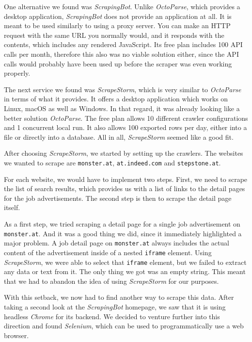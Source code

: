 \documentclass[runningheads]{llncs}
\begin{document}
One alternative we found was \textit{ScrapingBot}. Unlike \textit{OctoParse}, which provides a desktop application, \textit{ScrapingBot} does not provide an application at all. It is meant to be used similarly to using a proxy server. You can make an HTTP request with the same URL you normally would, and it responds with the contents, which includes any rendered JavaScript. Its free plan includes 100 API calls per month, therefore this also was no viable solution either, since the API calls would probably have been used up before the scraper was even working properly.

The next service we found was \textit{ScrapeStorm}, which is very similar to \textit{OctoParse} in terms of what it provides. It offers a desktop application which works on Linux, macOS as well as Windows. In that regard, it was already looking like a better solution \textit{OctoParse}. The free plan allows 10 different crawler configurations and 1 concurrent local run. It also allows 100 exported rows per day, either into a file or directly into a database. All in all, \textit{ScrapeStorm} seemed like a good fit.

After choosing \textit{ScrapeStorm}, we started by setting up the crawlers. The websites we wanted to scrape are \texttt{monster.at}, \texttt{at.indeed.com} and \texttt{stepstone.at}.

For each website, we would have to implement two steps. First, we need to scrape the list of search results, which provides us with a list of links to the detail pages for the job advertisements. The second step is then to scrape the detail page itself.

As a first step, we tried scraping a detail page for a single job advertisement on \texttt{monster.at}. And it was a good thing we did, since it immediately highlighted a major problem. A job detail page on \texttt{monster.at} always includes the actual content of the advertisement inside of a nested \texttt{iframe} element. Using \textit{ScrapeStorm}, we were able to select that \texttt{iframe} element, but we failed to extract any data or text from it. The only thing we got was an empty string. This meant that we had to abandon the idea of using \textit{ScrapeStorm} for our purposes.

With this setback, we now had to find another way to scrape this data. After taking a second look at the \textit{ScrapingBot} homepage, we saw that it is using headless \textit{Chrome} for its backend. We decided to venture further into this direction and found \textit{Selenium}, which can be used to programmatically use a web browser.
\end{document}
